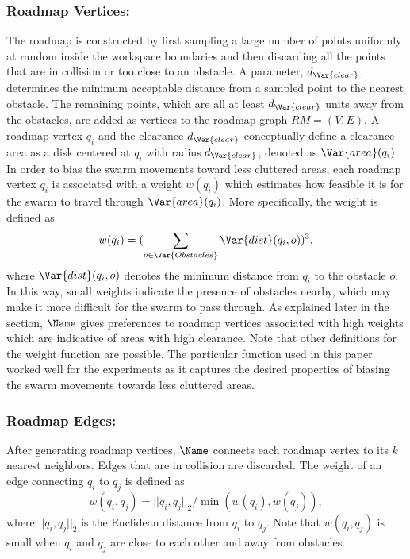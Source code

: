 \subsubsection{Roadmap Vertices:}
The roadmap is constructed by first sampling a large number of points
uniformly at random inside the workspace boundaries and then
discarding all the points that are in collision or too close to an
obstacle. A parameter, $d_\Var{clear}$, determines the minimum
acceptable distance from a sampled point to the nearest obstacle. The
remaining points, which are all at least $d_\Var{clear}$ units away
from the obstacles, are added as vertices to the roadmap graph $RM =
(V, E)$. A roadmap vertex $q_i$ and the clearance $d_\Var{clear}$
conceptually define a clearance area as a disk centered at $q_i$ with
radius $d_\Var{clear}$, denoted as $\Var{area}(q_i)$. In order to bias
the swarm movements toward less cluttered areas, each roadmap vertex
$q_i$ is associated with a weight $w(q_i)$ which estimates how
feasible it is for the swarm to travel through $\Var{area}(q_i)$. More
specifically, the weight is defined as
$$
w(q_i) = (\sum_{o \in \Var{Obstacles}} \Var{dist}(q_i, o))^3,
$$ 
where $\Var{dist}(q_i, o)$ denotes the minimum distance from $q_i$
to the obstacle $o$. In this way, small weights indicate the presence
of obstacles nearby, which may make it more difficult for the swarm to
pass through.  As explained later in the section, $\Name$ gives
preferences to roadmap vertices associated with high weights which are
indicative of areas with high clearance. Note that other definitions
for the weight function are possible. The particular function used in
this paper worked well for the experiments as it captures the desired
properties of biasing the swarm movements towards less cluttered
areas.

\subsubsection{Roadmap Edges:}
After generating roadmap vertices, $\Name$ connects each
roadmap vertex to its $k$ nearest neighbors. Edges that are in
collision are discarded. The weight of an edge connecting $q_i$ to
$q_j$ is defined as
$$
w(q_i, q_j) = ||q_i, q_j||_2 / \min(w(q_i), w(q_j)),
$$
where $||q_i, q_j||_2$ is the Euclidean distance from $q_i$ to $q_j$. Note
that $w(q_i, q_j)$ is small when $q_i$ and $q_j$ are close to each
other and away from obstacles.


